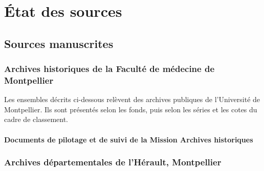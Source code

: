 
\section*{État des sources}


\subsection*{Sources manuscrites}

\begingroup
{}

\subsubsection*{Archives historiques de la Faculté de médecine de Montpellier}

\noindent
Les ensembles décrits ci-dessous relèvent des archives publiques de l'Université de Montpellier. Ils sont présentés selon les fonds, puis selon les séries et les cotes du cadre de classement.

\nocite{Statuts1383AHFM}

\printbibliography[
heading=none,
filter=sources-ahfm
]

\paragraph{Documents de pilotage et de suivi de la Mission Archives historiques}

\printbibliography[
heading=none,
keyword=src-ahfm-fonctionnement
]

\subsubsection*{Archives départementales de l'Hérault, Montpellier}

